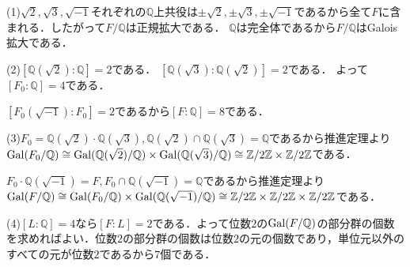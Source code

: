 \documentclass[
		book,
		head_space=20mm,
		foot_space=20mm,
		gutter=10mm,
		line_length=190mm
]{jlreq}
\begin{document}
(1)$\sqrt{2},\sqrt{3},\sqrt{-1}$それぞれの$\mathbb{Q}$上共役は$\pm\sqrt{2},\pm\sqrt{3},\pm\sqrt{-1}$であるから全て$F$に含まれる．したがって$F/\mathbb{Q}$は正規拡大である．
$\mathbb{Q}$は完全体であるから$F/\mathbb{Q}$はGalois拡大である．

(2)$[\mathbb{Q}(\sqrt{2}):\mathbb{Q}]=2$である．
$[\mathbb{Q}(\sqrt{3}):\mathbb{Q}(\sqrt{2})]=2$である．
よって$[F_0:\mathbb{Q}]=4$である．

$[F_0(\sqrt{-1}):F_0]=2$であるから$[F:\mathbb{Q}]=8$である．

(3)$F_0=\mathbb{Q}(\sqrt{2})\cdot \mathbb{Q}(\sqrt{3}),\mathbb{Q}(\sqrt{2})\cap \mathbb{Q}(\sqrt{3})=\mathbb{Q}$であるから推進定理より$\mathop{\mathrm{Gal}}(F_0/\mathbb{Q})\cong \mathop{\mathrm{Gal}}(\mathbb{Q}(\sqrt{2})/\mathbb{Q})\times \mathop{\mathrm{Gal}}(\mathbb{Q}(\sqrt{3})/\mathbb{Q})\cong \mathbb{Z}/2\mathbb{Z}\times \mathbb{Z}/2\mathbb{Z}$である．

$F_0 \cdot \mathbb{Q}(\sqrt{-1})=F,F_0\cap \mathbb{Q}(\sqrt{-1})=\mathbb{Q}$であるから推進定理より$\mathop{\mathrm{Gal}}(F/\mathbb{Q})\cong \mathop{\mathrm{Gal}}(F_0/\mathbb{Q})\times \mathop{\mathrm{Gal}}(\mathbb{Q}(\sqrt{-1})/\mathbb{Q})\cong \mathbb{Z}/2\mathbb{Z}\times \mathbb{Z}/2\mathbb{Z}\times \mathbb{Z}/2\mathbb{Z}$である．

(4)$[L:\mathbb{Q}]=4$なら$[F:L]=2$である．よって位数$2$の$\mathop{\mathrm{Gal}}(F/\mathbb{Q})$の部分群の個数を求めればよい．位数$2$の部分群の個数は位数$2$の元の個数であり，単位元以外のすべての元が位数$2$であるから$7$個である．
\end{document}
